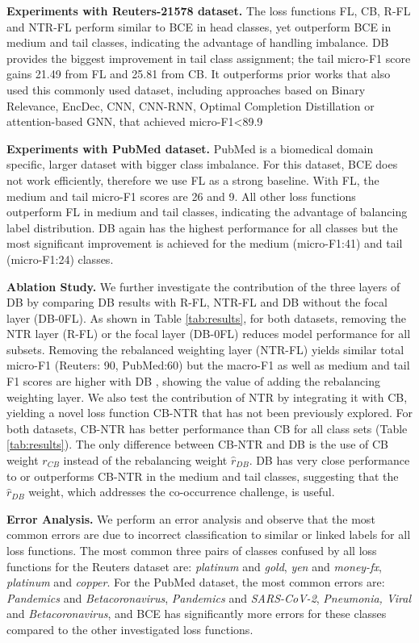 \documentclass[11pt]{article}
\begin{document}
\textbf{Experiments with Reuters-21578 dataset.} 
The loss functions FL, CB, R-FL and NTR-FL perform similar to BCE in head classes, yet outperform BCE in medium and tail classes, indicating the advantage of handling imbalance. DB provides the biggest improvement in tail class assignment; the tail micro-F1 score gains 21.49 from FL and 25.81 from CB.
It outperforms prior works that also used this commonly used dataset, including approaches based on Binary Relevance, EncDec, CNN, CNN-RNN, Optimal Completion Distillation or attention-based GNN, that achieved micro-F1<89.9 \citep{nam_neurips, pal2020magnet, tsai2020order}
 
\textbf{Experiments with PubMed dataset.} 
PubMed is a biomedical domain specific, larger dataset with bigger class imbalance. For this dataset, BCE does not work efficiently, therefore we use FL as a strong baseline. With FL, the medium and tail micro-F1 scores are 26 and 9. All other loss functions outperform FL in medium and tail classes, indicating the advantage of balancing label distribution. DB again has the highest performance for all classes but the most significant improvement is achieved for the medium (micro-F1:41) and tail (micro-F1:24) classes.



\textbf{Ablation Study.}
We further investigate the contribution of the three layers of DB by comparing DB results with R-FL, NTR-FL and DB without the focal layer (DB-0FL). As shown in Table \ref{tab:results}, 
for both datasets, removing the NTR layer (R-FL) or the focal layer (DB-0FL) reduces model performance for all subsets. 
Removing the rebalanced weighting layer (NTR-FL) yields similar total micro-F1 (Reuters: 90, PubMed:60) but the macro-F1 as well as medium and tail F1 scores are higher with DB 
, showing the value of adding the rebalancing weighting layer. We also test the contribution of NTR by integrating it with CB, yielding a novel loss function CB-NTR that has not been previously explored. For both datasets, CB-NTR has better performance than CB for all class sets (Table \ref{tab:results}). The only difference between CB-NTR and DB is the use of CB weight ${r}_{CB}$ instead of the rebalancing weight $\hat{r}_{DB}$. DB has very close performance to or outperforms CB-NTR in the medium and tail classes, suggesting that the $\hat{r}_{DB}$ weight, which addresses the co-occurrence challenge, is useful.

\textbf{Error Analysis.}
We perform an error analysis and observe that the most common errors are due to incorrect classification to similar or linked labels for all loss functions. The most common three pairs of classes confused by all loss functions for the Reuters dataset are: \textit{platinum} and \textit{gold}, \textit{yen} and \textit{money-fx}, \textit{platinum} and \textit{copper}. For the PubMed dataset, the most common errors are: \textit{Pandemics} and \textit{Betacoronavirus}, \textit{Pandemics} and \textit{SARS-CoV-2}, \textit{Pneumonia, Viral} and \textit{Betacoronavirus}, and BCE has significantly more errors for these classes compared to the other investigated loss functions.
\end{document}
